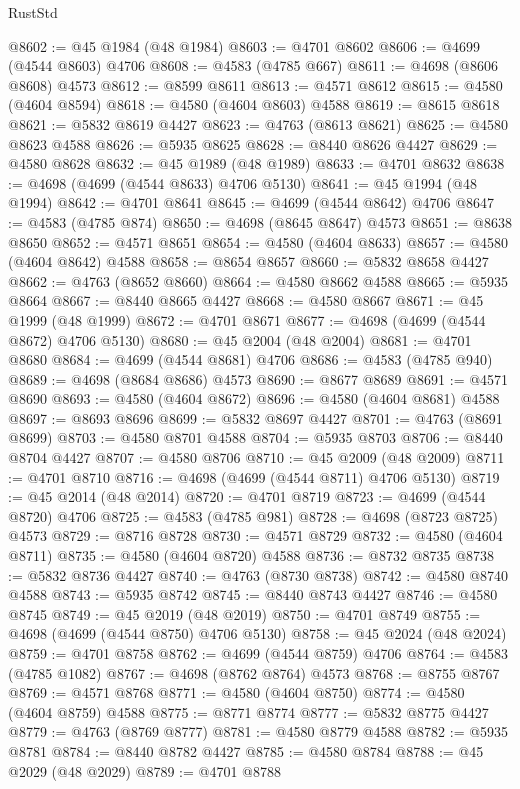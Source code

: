 \begin{lexlean}{RustStd}
\begin{coremodule}
@8602 := @45 @1984 (@48 @1984)
@8603 := @4701 @8602
@8606 := @4699 (@4544 @8603) @4706
@8608 := @4583 (@4785 @667)
@8611 := @4698 (@8606 @8608) @4573
@8612 := @8599 @8611
@8613 := @4571 @8612
@8615 := @4580 (@4604 @8594)
@8618 := @4580 (@4604 @8603) @4588
@8619 := @8615 @8618
@8621 := @5832 @8619 @4427
@8623 := @4763 (@8613 @8621)
@8625 := @4580 @8623 @4588
@8626 := @5935 @8625
@8628 := @8440 @8626 @4427
@8629 := @4580 @8628
@8632 := @45 @1989 (@48 @1989)
@8633 := @4701 @8632
@8638 := @4698 (@4699 (@4544 @8633) @4706 @5130)
@8641 := @45 @1994 (@48 @1994)
@8642 := @4701 @8641
@8645 := @4699 (@4544 @8642) @4706
@8647 := @4583 (@4785 @874)
@8650 := @4698 (@8645 @8647) @4573
@8651 := @8638 @8650
@8652 := @4571 @8651
@8654 := @4580 (@4604 @8633)
@8657 := @4580 (@4604 @8642) @4588
@8658 := @8654 @8657
@8660 := @5832 @8658 @4427
@8662 := @4763 (@8652 @8660)
@8664 := @4580 @8662 @4588
@8665 := @5935 @8664
@8667 := @8440 @8665 @4427
@8668 := @4580 @8667
@8671 := @45 @1999 (@48 @1999)
@8672 := @4701 @8671
@8677 := @4698 (@4699 (@4544 @8672) @4706 @5130)
@8680 := @45 @2004 (@48 @2004)
@8681 := @4701 @8680
@8684 := @4699 (@4544 @8681) @4706
@8686 := @4583 (@4785 @940)
@8689 := @4698 (@8684 @8686) @4573
@8690 := @8677 @8689
@8691 := @4571 @8690
@8693 := @4580 (@4604 @8672)
@8696 := @4580 (@4604 @8681) @4588
@8697 := @8693 @8696
@8699 := @5832 @8697 @4427
@8701 := @4763 (@8691 @8699)
@8703 := @4580 @8701 @4588
@8704 := @5935 @8703
@8706 := @8440 @8704 @4427
@8707 := @4580 @8706
@8710 := @45 @2009 (@48 @2009)
@8711 := @4701 @8710
@8716 := @4698 (@4699 (@4544 @8711) @4706 @5130)
@8719 := @45 @2014 (@48 @2014)
@8720 := @4701 @8719
@8723 := @4699 (@4544 @8720) @4706
@8725 := @4583 (@4785 @981)
@8728 := @4698 (@8723 @8725) @4573
@8729 := @8716 @8728
@8730 := @4571 @8729
@8732 := @4580 (@4604 @8711)
@8735 := @4580 (@4604 @8720) @4588
@8736 := @8732 @8735
@8738 := @5832 @8736 @4427
@8740 := @4763 (@8730 @8738)
@8742 := @4580 @8740 @4588
@8743 := @5935 @8742
@8745 := @8440 @8743 @4427
@8746 := @4580 @8745
@8749 := @45 @2019 (@48 @2019)
@8750 := @4701 @8749
@8755 := @4698 (@4699 (@4544 @8750) @4706 @5130)
@8758 := @45 @2024 (@48 @2024)
@8759 := @4701 @8758
@8762 := @4699 (@4544 @8759) @4706
@8764 := @4583 (@4785 @1082)
@8767 := @4698 (@8762 @8764) @4573
@8768 := @8755 @8767
@8769 := @4571 @8768
@8771 := @4580 (@4604 @8750)
@8774 := @4580 (@4604 @8759) @4588
@8775 := @8771 @8774
@8777 := @5832 @8775 @4427
@8779 := @4763 (@8769 @8777)
@8781 := @4580 @8779 @4588
@8782 := @5935 @8781
@8784 := @8440 @8782 @4427
@8785 := @4580 @8784
@8788 := @45 @2029 (@48 @2029)
@8789 := @4701 @8788

\end{coremodule}
\end{lexlean}
